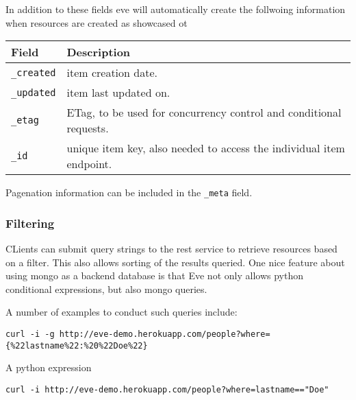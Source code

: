 In addition to these fields eve will automatically create the
follwoing information when resources are created as showcased ot 



\begin{tabular}{ll}
Field	& Description \\
\hline
\verb|_created|	& item creation date.\\
\verb|_updated|	& item last updated on.\\
\verb|_etag|	& ETag, to be used for concurrency control and conditional requests.\\
\verb|_id|	& unique item key, also needed to access the individual item
  endpoint.\\
\end{tabular}

Pagenation information can be included in the \verb|_meta| field.


\subsubsection{Filtering}


CLients can submit query strings to the rest service to retrieve
resources based on a filter. This also allows sorting of the results
queried. One nice feature about using mongo as a backend database is
that Eve not only allows python conditional expressions, but also
mongo queries.

A number of examples to conduct such queries include:


\begin{lstlisting}
curl -i -g http://eve-demo.herokuapp.com/people?where={%22lastname%22:%20%22Doe%22}
\end{lstlisting}

A python expression

\begin{lstlisting}
curl -i http://eve-demo.herokuapp.com/people?where=lastname=="Doe"
\end{lstlisting}

\begin{comment}
\subsection{Rendering Data in UI}

\TODO{seems incomplete}

In this section, we are talking about the way of using HATEOAS
practically in user interface development in web applications.

\begin{lstlisting}
  <resource>
  <link rel='child' href='student' title='student'/>
  </resource>
\end{lstlisting}

This is the practical representation of the HATEOAS in real world
applications.
\end{comment}

